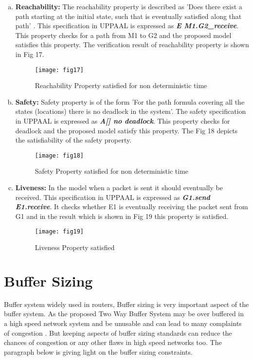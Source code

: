 \documentclass[letterpaper]{article}
\begin{document}
	
\begin{enumerate}[(a).]
	\item \textbf{Reachability:} The reachability property is described as 'Does there exist a path starting at the initial state, such that  is eventually satisfied along that path' \cite{BDL06}. This specification in UPPAAL is expressed as \textbf{\textit{E M1.G2\_receive}}. This property checks for a path from M1 to G2 and the proposed model satisfies this property. The verification result of reachability property is shown in Fig 17.

\begin{figure}[bpht!]
\centering
	\texttt{[image: fig17]}
	\caption{Reachability Property satisfied for non deterministic time}
	\label{Fig17}
\end{figure}
	
	\item \textbf{Safety:} Safety property is of the form 'For the path formula  covering all the states (locations) there is no deadlock in the system'. The safety specification in UPPAAL is expressed as \textbf{\textit{A[] no deadlock}}. This property checks for deadlock and the proposed model satisfy this property. The Fig 18 depicts the  satisfiability of the safety property. 
  
\begin{figure}[bpht!]
\centering
	\texttt{[image: fig18]}
		\caption{Safety Property satisfied for non deterministic time}
	\label{Fig18}
\end{figure}
	
	\item \textbf{Liveness:} In the model when a packet is sent it should eventually be received. This specification in UPPAAL is expressed as \textbf{\textit{G1.send  E1.receive}}. It checks whether E1 is eventually receiving the packet sent from G1 and in the result which is shown in Fig 19 this property is satisfied. 

\begin{figure}[bpht!]
\centering
	\texttt{[image: fig19]}
		\caption{Liveness Property satisfied}
	\label{Fig19}
\end{figure}
\end{enumerate}





\section{Buffer Sizing}
\label{11}
Buffer system widely used in routers, Buffer sizing is very important aspect of the buffer system. As the proposed Two Way Buffer System may be over buffered in a high speed network system and be unusable and can lead to many complaints of congestion \cite{REF1}. But keeping aspects of buffer sizing standards can reduce the chances of congestion or any other flaws in high speed networks too.  The paragraph below is giving light on the buffer sizing constraints.
\end{document}
